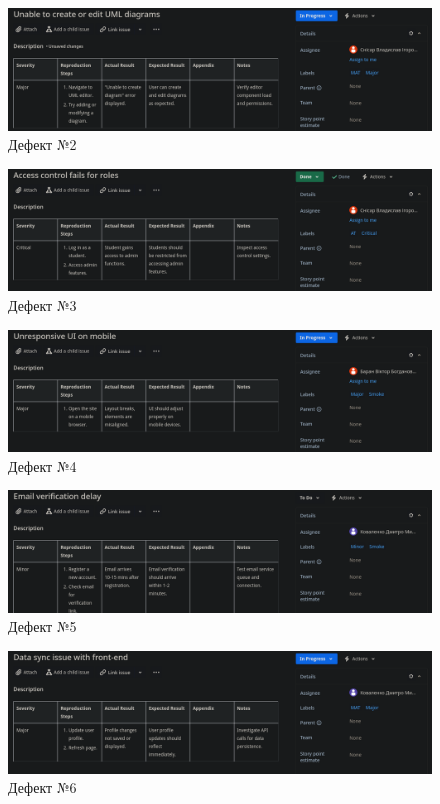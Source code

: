 \documentclass[oneside,14pt]{extarticle}
\begin{document}
\begin{normalsize}
	\begin{figure}[H]
		\centering
		\includegraphics[width=\columnwidth]{3}
		\caption{Дефект №2}
	\end{figure}
		
	\begin{figure}[H]
		\centering
		\includegraphics[width=\columnwidth]{4}
		\caption{Дефект №3}
	\end{figure}
	
	\begin{figure}[H]
		\centering
		\includegraphics[width=\columnwidth]{5}
		\caption{Дефект №4}
	\end{figure}
	
	\begin{figure}[H]
		\centering
		\includegraphics[width=\columnwidth]{6}
		\caption{Дефект №5}
	\end{figure}
	
	\begin{figure}[H]
		\centering
		\includegraphics[width=\columnwidth]{7}
		\caption{Дефект №6}
	\end{figure}
	

\end{normalsize}
\end{document}
